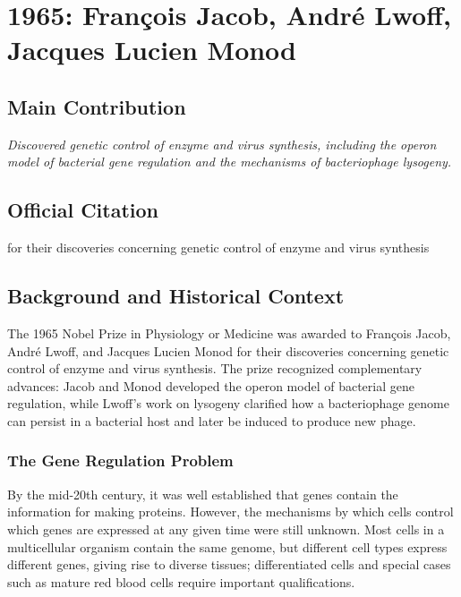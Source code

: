 \chapter[1965 --- Jacob, Lwoff, and Monod]{1965: Fran\c{c}ois Jacob, Andr\'e Lwoff, Jacques Lucien Monod}
\label{ch:1965_Jacob}

\section*{Main Contribution}

\textit{Discovered genetic control of enzyme and virus synthesis, including the operon model of bacterial gene regulation and the mechanisms of bacteriophage lysogeny.}\cite{nobel-1965,lecture-1965,lecture-lwoff-1965}

\section{Official Citation}

for their discoveries concerning genetic control of enzyme and virus synthesis

\section{Background and Historical Context}

The 1965 Nobel Prize in Physiology or Medicine was awarded to Fran\c{c}ois Jacob, Andr\'e Lwoff, and Jacques Lucien Monod for their discoveries concerning genetic control of enzyme and virus synthesis. The prize recognized complementary advances: Jacob and Monod developed the operon model of bacterial gene regulation, while Lwoff's work on lysogeny clarified how a bacteriophage genome can persist in a bacterial host and later be induced to produce new phage.

\subsection{The Gene Regulation Problem}

By the mid-20th century, it was well established that genes contain the information for making proteins. However, the mechanisms by which cells control which genes are expressed at any given time were still unknown. Most cells in a multicellular organism contain the same genome, but different cell types express different genes, giving rise to diverse tissues; differentiated cells and special cases such as mature red blood cells require important qualifications.

